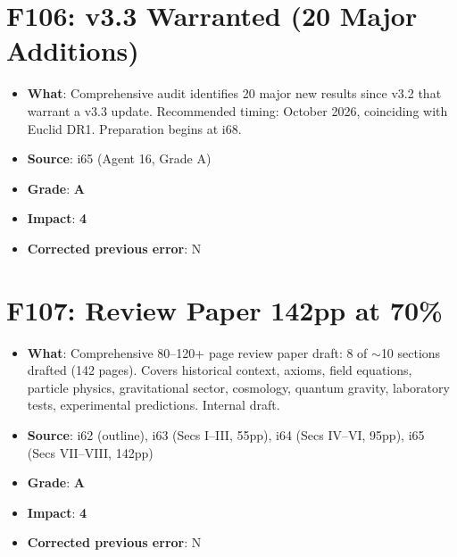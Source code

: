 \documentclass[11pt,a4paper]{article}
\newcommand{\grade}[1]{\textbf{#1}}
\newcommand{\impact}[1]{\textbf{#1}}
\begin{document}
\section{F106: v3.3 Warranted (20 Major Additions)}
\begin{itemize}[nosep]
\item \textbf{What}: Comprehensive audit identifies 20 major new results since v3.2 that warrant a v3.3 update. Recommended timing: October 2026, coinciding with Euclid DR1. Preparation begins at i68.
\item \textbf{Source}: i65 (Agent 16, Grade A)
\item \textbf{Grade}: \grade{A}
\item \textbf{Impact}: \impact{4}
\item \textbf{Corrected previous error}: N
\end{itemize}

\section{F107: Review Paper 142pp at 70\%}
\begin{itemize}[nosep]
\item \textbf{What}: Comprehensive 80--120+ page review paper draft: 8 of $\sim$10 sections drafted (142 pages). Covers historical context, axioms, field equations, particle physics, gravitational sector, cosmology, quantum gravity, laboratory tests, experimental predictions. Internal draft.
\item \textbf{Source}: i62 (outline), i63 (Secs I--III, 55pp), i64 (Secs IV--VI, 95pp), i65 (Secs VII--VIII, 142pp)
\item \textbf{Grade}: \grade{A}
\item \textbf{Impact}: \impact{4}
\item \textbf{Corrected previous error}: N
\end{itemize}

\end{document}
